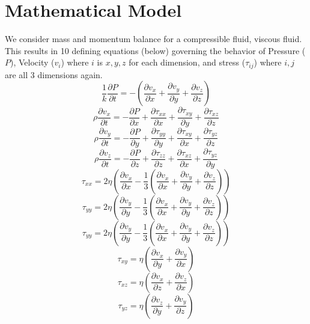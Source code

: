 \section*{\myfont Mathematical Model} %
We consider mass and momentum balance for a compressible fluid, viscous fluid. This results in 10 defining equations (below) governing the behavior of Pressure ($P$), Velocity ($v_i$) where $i$ is $x,y,z$ for each dimension, and stress ($\tau_{ij}$) where $i,j$ are all 3 dimensions again.
\begin{equation}
	\frac{1}{k}\frac{\partial P}{\partial t} = -\left(\frac{\partial v_x}{\partial x} + \frac{\partial v_y}{\partial y} + \frac{\partial v_z}{\partial z}\right)
\end{equation}
\begin{equation}
	\rho \frac{\partial v_x}{\partial t} = - \frac{\partial P}{\partial x} + \frac{\partial \tau_{xx}}{\partial x} + \frac{\partial \tau_{xy}}{\partial y} + \frac{\partial \tau_{xz}}{\partial z}
\end{equation}
\begin{equation}
	\rho \frac{\partial v_y}{\partial t} = - \frac{\partial P}{\partial y} + \frac{\partial \tau_{yy}}{\partial y} + \frac{\partial \tau_{xy}}{\partial x} + \frac{\partial \tau_{yz}}{\partial z}
\end{equation}
\begin{equation}
	\rho \frac{\partial v_z}{\partial t} = - \frac{\partial P}{\partial z} + \frac{\partial \tau_{zz}}{\partial z} + \frac{\partial \tau_{xz}}{\partial x} + \frac{\partial \tau_{yz}}{\partial y}
\end{equation}
\begin{equation}
	\tau_{xx} = 2 \eta \left( \frac{\partial v_x}{\partial x} - \frac{1}{3}\left(\frac{\partial v_x}{\partial x} + \frac{\partial v_y}{\partial y} + \frac{\partial v_z}{\partial z}\right)\right)
\end{equation}
\begin{equation}
	\tau_{yy} = 2 \eta \left( \frac{\partial v_y}{\partial y} - \frac{1}{3}\left(\frac{\partial v_x}{\partial x} + \frac{\partial v_y}{\partial y} + \frac{\partial v_z}{\partial z}\right)\right)
\end{equation}
\begin{equation}
	\tau_{yy} = 2 \eta \left( \frac{\partial v_y}{\partial y} - \frac{1}{3}\left(\frac{\partial v_x}{\partial x} + \frac{\partial v_y}{\partial y} + \frac{\partial v_z}{\partial z}\right)\right)
\end{equation}
\begin{equation}
	\tau_{xy} = \eta \left(\frac{\partial v_x}{\partial y} + \frac{\partial v_y}{\partial x}\right)
\end{equation}
\begin{equation}
	\tau_{xz} = \eta \left(\frac{\partial v_x}{\partial z} + \frac{\partial v_z}{\partial x}\right)
\end{equation}
\begin{equation}
	\tau_{yz} = \eta \left(\frac{\partial v_z}{\partial y} + \frac{\partial v_y}{\partial z}\right)
\end{equation}
